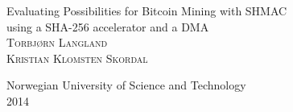 \documentclass[a4paper]{report}
\begin{document}
\begin{titlepage}
	\begin{center}
		{\huge Evaluating Possibilities for Bitcoin Mining with SHMAC}\\[0.5cm]
		{\large using a SHA-256 accelerator and a DMA}\\[3.5cm]

		\textsc{Torbjørn Langland}\\
		\textsc{Kristian Klomsten Skordal}

		\vfill
		{\large Norwegian University of Science and Technology}\\[0.2em]
		{2014}
	\end{center}
\end{titlepage}



\tableofcontents












\end{document}
